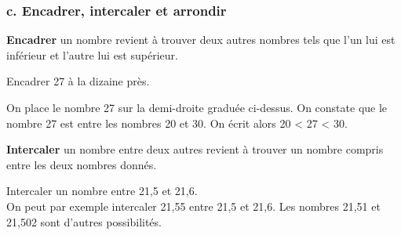 \vspace{-0.5cm}
\subsubsection*{c. Encadrer, intercaler et arrondir}


\begin{Définition}[c]
\textbf{Encadrer} un nombre revient à trouver deux autres nombres tels que l'un lui est inférieur et l'autre lui est supérieur.
\end{Définition}

\begin{Exemple}
Encadrer 27 à la dizaine près.
\begin{center}
\end{center}
On place le nombre 27 sur la demi-droite graduée ci-dessus.
On constate que le nombre 27 est entre les nombres 20 et 30. On écrit alors 20 < 27 < 30.

\end{Exemple}

\begin{Définition}[c]
\textbf{Intercaler} un nombre entre deux autres revient à trouver un nombre compris entre les deux nombres donnés.
\end{Définition}

\begin{Exemple}
\begin{minipage}[c]{.7\textwidth}
Intercaler un nombre entre 21,5 et 21,6. \\
On peut par exemple intercaler 21,55 entre 21,5 et 21,6. Les nombres 21,51 et 21,502 sont d'autres possibilités.
\end{minipage} \hfill \begin{minipage}[c]{.3\textwidth}
\begin{center}
\end{center}
\end{minipage}

\end{Exemple}

